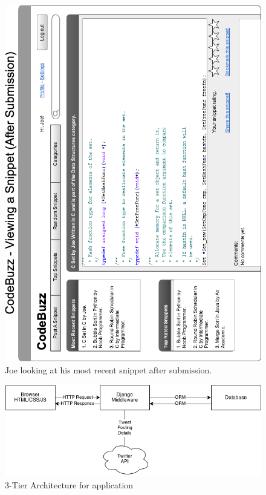 \documentclass{sig-alt-release2}
\begin{document}
\begin{figure}
\includegraphics[width=\textwidth]{../imgs/CSnippetAfterSubmissionHorz.png}
\caption{Joe looking at his most recent snippet after submission.}
\label{fig:viewAfterSubmission}
\end{figure}

\begin{figure}
\centering
\includegraphics[scale=0.6]{../imgs/N-TierArchitecture.png}
\caption{3-Tier Architecture for application}
\label{fig:ntier}
\end{figure}
\end{document}
